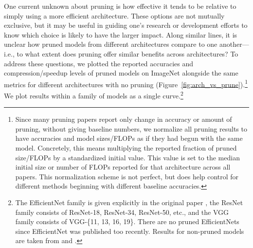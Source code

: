 One current unknown about pruning is how effective it tends to be relative to simply using a more efficient architecture. These options are not mutually exclusive, but it may be useful in guiding one's research or development efforts to know which choice is likely to have the larger impact. Along similar lines, it is unclear how pruned models from different architectures compare to one another---i.e., to what extent does pruning offer similar benefits across architectures?
To address these questions, we plotted the reported accuracies and compression/speedup levels of pruned models on ImageNet alongside the same metrics for different architectures with no pruning (Figure~\ref{fig:arch_vs_prune}).\footnote{
    Since many pruning papers report only change in accuracy or amount of pruning, without giving baseline numbers, we normalize all pruning results to have accuracies and model sizes/FLOPs as if they had begun with the same model. Concretely, this means multiplying the reported fraction of pruned size/FLOPs by a standardized initial value. This value is set to the median initial size or number of FLOPs reported for that architecture across all papers. This normalization scheme is not perfect, but does help control for different methods beginning with different baseline accuracies.
}
We plot results within a family of models as a single curve.\footnote{
    The EfficientNet family is given explicitly in the original paper \cite{efficientnet}, the ResNet family consists of ResNet-18, ResNet-34, ResNet-50, etc., and the VGG family consists of VGG-\{11, 13, 16, 19\}. There are no pruned EfficientNets since EfficientNet was published too recently. Results for non-pruned models are taken from \cite{efficientnet} and \cite{luigi}.
}


